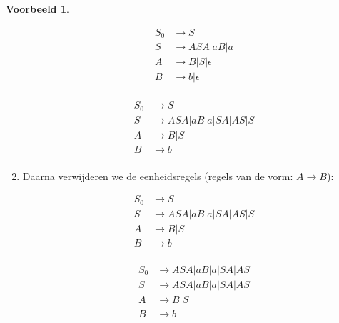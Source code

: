 \documentclass[12pt,a4paper]{article}
\theoremstyle{definition}
\newtheorem{vb}{Voorbeeld}[section]
\newcommand{\ra}{\ensuremath{\rightarrow}}
\begin{document}
\begin{vb}
\begin{enumerate}
			\begin{minipage}{.4\textwidth}
				\begin{align*}
				S_0&\ra S\\
				S &\ra ASA|aB|a\\
				A&\ra B|S|\epsilon\\
				B&\ra b|\epsilon\\
				\end{align*}
			\end{minipage}
			\begin{minipage}{.3\textwidth}
				\begin{align*}
				S_0&\ra S\\
				S&\ra ASA|aB|a|SA|AS|S\\
				A&\ra B|S\\
				B&\ra b\\
				\end{align*}
				
			\end{minipage}
			\item Daarna verwijderen we de eenheidsregels (regels van de vorm: $A\ra B$):\\
			\begin{minipage}{.4\textwidth}
				\begin{align*}
			  	S_0&\ra S\\
				S&\ra ASA|aB|a|SA|AS|S\\
				A&\ra B|S\\
				B&\ra b\\
				\end{align*}
			\end{minipage}
			\begin{minipage}{.3\textwidth}
				\begin{align*}
				S_0&\ra ASA|aB|a|SA|AS\\
				S&\ra ASA|aB|a|SA|AS\\
				A&\ra B|S\\
				B&\ra b\\
				\end{align*}
			\end{minipage}
			

\end{enumerate}
\end{vb}
\end{document}
